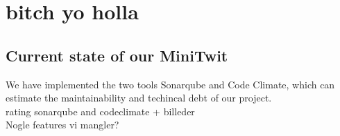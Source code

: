 \section{bitch yo holla}
\subsection{Current state of our MiniTwit}
We have implemented the two tools Sonarqube and Code Climate, which can estimate the maintainability and techincal debt of our project.\\


rating sonarqube and codeclimate + billeder\\
Nogle features vi mangler?